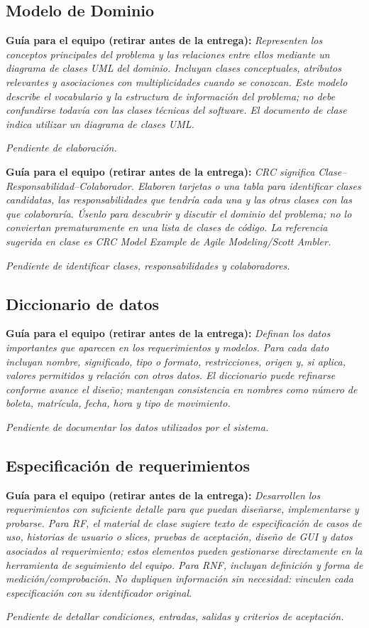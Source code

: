 \documentclass[12pt,letterpaper]{article}
\newcommand{\guia}[1]{\par\smallskip\noindent\textbf{Guía para el equipo (retirar antes de la entrega):} \textit{#1}\par\smallskip}
\begin{document}
\subsection{Modelo de Dominio}
\guia{Representen los conceptos principales del problema y las relaciones entre ellos mediante un diagrama de clases UML del dominio. Incluyan clases conceptuales, atributos relevantes y asociaciones con multiplicidades cuando se conozcan. Este modelo describe el vocabulario y la estructura de información del problema; no debe confundirse todavía con las clases técnicas del software. El documento de clase indica utilizar un diagrama de clases UML.}
\textit{Pendiente de elaboración.}
\guia{CRC significa Clase--Responsabilidad--Colaborador. Elaboren tarjetas o una tabla para identificar clases candidatas, las responsabilidades que tendría cada una y las otras clases con las que colaboraría. Úsenlo para descubrir y discutir el dominio del problema; no lo conviertan prematuramente en una lista de clases de código. La referencia sugerida en clase es CRC Model Example de Agile Modeling/Scott Ambler.}
\textit{Pendiente de identificar clases, responsabilidades y colaboradores.}
\subsection{Diccionario de datos}
\guia{Definan los datos importantes que aparecen en los requerimientos y modelos. Para cada dato incluyan nombre, significado, tipo o formato, restricciones, origen y, si aplica, valores permitidos y relación con otros datos. El diccionario puede refinarse conforme avance el diseño; mantengan consistencia en nombres como número de boleta, matrícula, fecha, hora y tipo de movimiento.}
\textit{Pendiente de documentar los datos utilizados por el sistema.}
\subsection{Especificación de requerimientos}
\guia{Desarrollen los requerimientos con suficiente detalle para que puedan diseñarse, implementarse y probarse. Para RF, el material de clase sugiere texto de especificación de casos de uso, historias de usuario o slices, pruebas de aceptación, diseño de GUI y datos asociados al requerimiento; estos elementos pueden gestionarse directamente en la herramienta de seguimiento del equipo. Para RNF, incluyan definición y forma de medición/comprobación. No dupliquen información sin necesidad: vinculen cada especificación con su identificador original.}
\textit{Pendiente de detallar condiciones, entradas, salidas y criterios de aceptación.}
\end{document}
